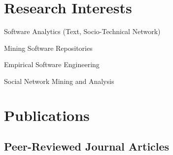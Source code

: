 \documentclass[12pt,letterpaper]{article}
\newcommand{\listitemspace}{0.15em}
\renewenvironment{itemize}
{\begin{list}{}{\setlength{\leftmargin}{0em}
				\setlength{\parskip}{0em}
				\setlength{\itemsep}{\listitemspace}
				\setlength{\parsep}{\listitemspace}}}
{\end{list}}
\begin{document}
%
%
%			    
%
              




\section*{Research Interests}

\begin{itemize}
	
\item Software Analytics (Text, Socio-Technical Network)
\item Mining Software Repositories
\item Empirical Software Engineering
\item Social Network Mining and Analysis


\end{itemize}



\section*{Publications}


%
\subsection*{Peer-Reviewed Journal Articles}
\end{document}
